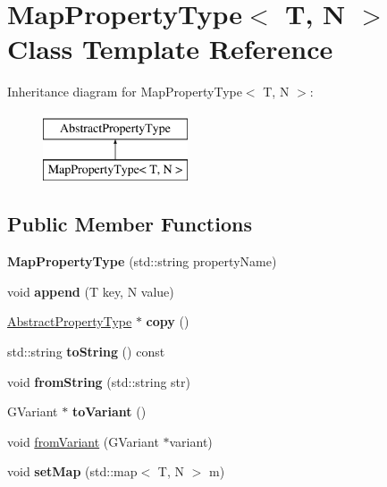 \hypertarget{classMapPropertyType}{\section{Map\-Property\-Type$<$ T, N $>$ Class Template Reference}
\label{classMapPropertyType}
}
Inheritance diagram for Map\-Property\-Type$<$ T, N $>$\-:\begin{figure}[H]
\begin{center}
\leavevmode
\includegraphics[height=2.000000cm]{classMapPropertyType}
\end{center}
\end{figure}
\subsection*{Public Member Functions}
\begin{DoxyCompactItemize}
\item 
\hypertarget{classMapPropertyType_aa1a20f8411d6642e6d9d16d2c49e8616}{{\bfseries Map\-Property\-Type} (std\-::string property\-Name)}\label{classMapPropertyType_aa1a20f8411d6642e6d9d16d2c49e8616}

\item 
\hypertarget{classMapPropertyType_a204d5a2ef375b9f96badbac88e90c399}{void {\bfseries append} (T key, N value)}\label{classMapPropertyType_a204d5a2ef375b9f96badbac88e90c399}

\item 
\hypertarget{classMapPropertyType_abcc0f1c2cd4faff2859420f90dd67cad}{\hyperlink{classAbstractPropertyType}{Abstract\-Property\-Type} $\ast$ {\bfseries copy} ()}\label{classMapPropertyType_abcc0f1c2cd4faff2859420f90dd67cad}

\item 
\hypertarget{classMapPropertyType_a662d25c3cd9e1732f0cd2dabd38c1bcd}{std\-::string {\bfseries to\-String} () const }\label{classMapPropertyType_a662d25c3cd9e1732f0cd2dabd38c1bcd}

\item 
\hypertarget{classMapPropertyType_aae407d89167cad46b2ab63971d1e68f5}{void {\bfseries from\-String} (std\-::string str)}\label{classMapPropertyType_aae407d89167cad46b2ab63971d1e68f5}

\item 
\hypertarget{classMapPropertyType_a0dfca18093e88f7ae8788bf1ce852109}{G\-Variant $\ast$ {\bfseries to\-Variant} ()}\label{classMapPropertyType_a0dfca18093e88f7ae8788bf1ce852109}

\item 
void \hyperlink{classMapPropertyType_a9038e06690c5d3718be1aadb6752bfbe}{from\-Variant} (G\-Variant $\ast$variant)
\item 
\hypertarget{classMapPropertyType_abfecbe98555c77f13bab01892ea143a7}{void {\bfseries set\-Map} (std\-::map$<$ T, N $>$ m)}\label{classMapPropertyType_abfecbe98555c77f13bab01892ea143a7}

\end{DoxyCompactItemize}
